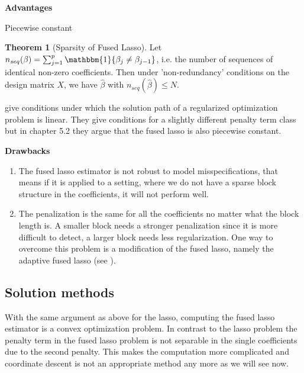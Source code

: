 \documentclass{article}
\theoremstyle{definition}
\newtheorem{theorem}{Theorem}
\begin{document}
\noindent\textbf{Advantages}

\noindent Piecewise constant
\begin{theorem}[Sparsity of Fused Lasso] \citep{fused}
	Let $n_{seq}(\beta) = \sum_{j=1}^{p} \mathbbm{1} \{\beta_j \neq \beta_{j-1}\}$, i.e. the number of sequences of identical non-zero coefficients. Then under 'non-redundancy' conditions on the design matrix $X$, we have $\hat{\beta}$ with $n_{seq}(\hat{\beta}) \leq N$.
\end{theorem}

\citet{rosset2007piecewise} give conditions under which the solution path of a regularized optimization problem is linear. They give conditions for a slightly different penalty term class but in chapter 5.2 they argue that the fused lasso is also piecewise constant.

\noindent\textbf{Drawbacks}
\begin{enumerate}
	\item The fused lasso estimator is not robust to model misspecifications, that means if it is applied to a setting, where we do not have a sparse block structure in the coefficients, it will not perform well.
	\item The penalization is the same for all the coefficients no matter what the block length is. A smaller block needs a stronger penalization since it is more difficult to detect, a larger block needs less regularization. One way to overcome this problem is a modification of the fused lasso, namely the adaptive fused lasso (see \citep{rinaldoproperties}).
\end{enumerate}

\subsection{Solution methods}

With the same argument as above for the lasso, computing the fused lasso estimator is a convex optimization problem. In contrast to the lasso problem the penalty term in the fused lasso problem is not separable in the single coefficients due to the second penalty. This makes the computation more complicated and coordinate descent is not an appropriate method any more as we will see now.
\end{document}
